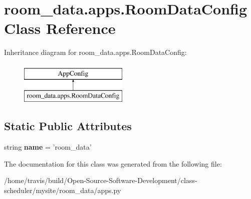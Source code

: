 \hypertarget{classroom__data_1_1apps_1_1_room_data_config}{\section{room\-\_\-data.\-apps.\-Room\-Data\-Config Class Reference}
\label{classroom__data_1_1apps_1_1_room_data_config}
}
Inheritance diagram for room\-\_\-data.\-apps.\-Room\-Data\-Config\-:\begin{figure}[H]
\begin{center}
\leavevmode
\includegraphics[height=2.000000cm]{classroom__data_1_1apps_1_1_room_data_config}
\end{center}
\end{figure}
\subsection*{Static Public Attributes}
\begin{DoxyCompactItemize}
\item 
\hypertarget{classroom__data_1_1apps_1_1_room_data_config_a1e3dda1d063b567cfe254041713219cf}{string {\bfseries name} = 'room\-\_\-data'}\label{classroom__data_1_1apps_1_1_room_data_config_a1e3dda1d063b567cfe254041713219cf}

\end{DoxyCompactItemize}


The documentation for this class was generated from the following file\-:\begin{DoxyCompactItemize}
\item 
/home/travis/build/\-Open-\/\-Source-\/\-Software-\/\-Development/class-\/scheduler/mysite/room\-\_\-data/apps.\-py\end{DoxyCompactItemize}
